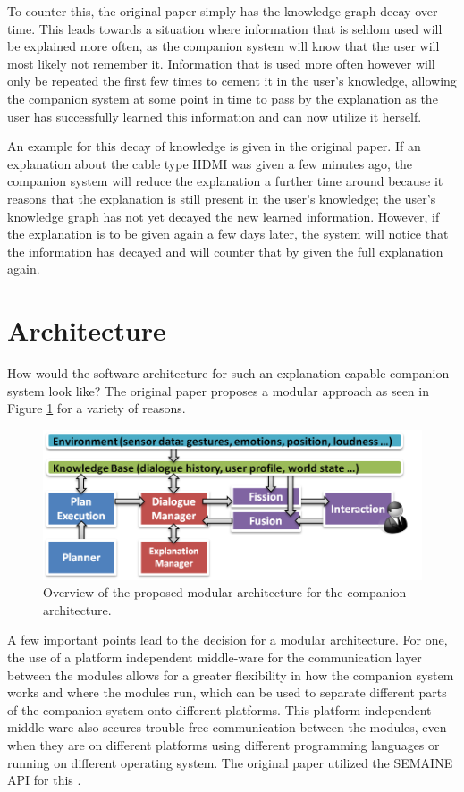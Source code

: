 \documentclass[a4paper]{article}
\begin{document}
To counter this, the original paper simply has the knowledge graph decay over time. This leads towards a situation where information that is seldom used will be explained more often, as the companion system will know that the user will most likely not remember it. Information that is used more often however will only be repeated the first few times to cement it in the user's knowledge, allowing the companion system at some point in time to pass by the explanation as the user has successfully learned this information and can now utilize it herself.

An example for this decay of knowledge is given in the original paper. If an explanation about the cable type HDMI was given a few minutes ago, the companion system will reduce the explanation a further time around because it reasons that the explanation is still present in the user's knowledge; the user's knowledge graph has not yet decayed the new learned information. However, if the explanation is to be given again a few days later, the system will notice that the information has decayed and will counter that by given the full explanation again.

\section{Architecture}

How would the software architecture for such an explanation capable companion system look like? The original paper proposes a modular approach as seen in Figure \ref{fig:architecture} for a variety of reasons.

\begin{figure}[H]
	\centering
	\includegraphics[width=12cm]{arch.png}
	\caption{Overview of the proposed modular architecture for the companion architecture.}
	\label{fig:architecture}
\end{figure}

A few important points lead to the decision for a modular architecture. For one, the use of a platform independent middle-ware for the communication layer between the modules allows for a greater flexibility in how the companion system works and where the modules run, which can be used to separate different parts of the companion system onto different platforms. This platform independent middle-ware also secures trouble-free communication between the modules, even when they are on different platforms using different programming languages or running on different operating system. The original paper utilized the SEMAINE API for this \cite{schroder2010semaine}.
\end{document}
